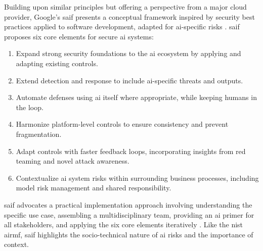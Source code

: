 Building upon similar principles but offering a perspective from a major cloud provider, Google's \gls{saif} presents a conceptual framework inspired by security best practices applied to software development, adapted for \gls{ai}-specific risks \cite{hansen_introducing_2023}. \gls{saif} proposes six core elements for secure \gls{ai} systems\cite{hansen_introducing_2023}:

\begin{enumerate}
\item Expand strong security foundations to the \gls{ai} ecosystem by applying and adapting existing controls.
\item Extend detection and response to include \gls{ai}-specific threats and outputs.
\item Automate defenses using \gls{ai} itself where appropriate, while keeping humans in the loop.
\item Harmonize platform-level controls to ensure consistency and prevent fragmentation.
\item Adapt controls with faster feedback loops, incorporating insights from red teaming and novel attack awareness.
\item Contextualize \gls{ai} system risks within surrounding business processes, including model risk management and shared responsibility.
\end{enumerate}

\gls{saif} advocates a practical implementation approach involving understanding the specific use case, assembling a multidisciplinary team, providing an \gls{ai} primer for all stakeholders, and applying the six core elements iteratively \cite{hansen_introducing_2023}. Like the \gls{nist} \gls{airmf}, \gls{saif} highlights the socio-technical nature of \gls{ai} risks and the importance of context.


